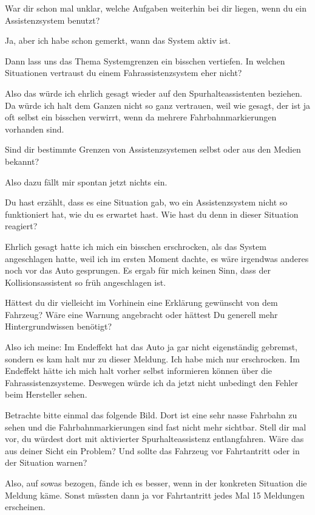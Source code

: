 \interviewerin
War dir schon mal unklar, welche Aufgaben weiterhin bei dir liegen,
wenn du ein Assistenzsystem benutzt?

Ja, aber ich habe schon gemerkt, wann das System aktiv ist.

\interviewerin
Dann lass uns das Thema Systemgrenzen ein bisschen vertiefen. In welchen
Situationen vertraust du einem Fahrassistenzsystem eher nicht?

Also das würde ich ehrlich gesagt wieder auf den Spurhalteassistenten
beziehen. Da würde ich halt dem Ganzen nicht so ganz vertrauen, weil wie
gesagt, der ist ja oft selbst ein bisschen verwirrt, wenn da mehrere
Fahrbahnmarkierungen vorhanden sind.

\interviewerin
Sind dir bestimmte Grenzen von Assistenzsystemen selbst oder aus den
Medien bekannt?

Also dazu fällt mir spontan jetzt nichts ein.

\interviewerin
Du hast erzählt, dass es eine Situation gab, wo ein Assistenzsystem
nicht so funktioniert hat, wie du es erwartet hast. Wie hast du denn in
dieser Situation reagiert?

Ehrlich gesagt hatte ich mich ein bisschen erschrocken, als das System
angeschlagen hatte, weil ich im ersten Moment dachte, es wäre irgendwas
anderes noch vor das Auto gesprungen. Es ergab für mich keinen Sinn,
dass der Kollisionsassistent so früh angeschlagen ist.

\interviewerin
Hättest du dir vielleicht im Vorhinein eine Erklärung gewünscht von dem
Fahrzeug? Wäre eine Warnung angebracht oder hättest Du generell mehr
Hintergrundwissen benötigt?

Also ich meine: Im Endeffekt hat das Auto ja gar nicht eigenständig
gebremst, sondern es kam halt nur zu dieser Meldung. Ich habe mich nur
erschrocken. Im Endeffekt hätte ich mich halt vorher selbst informieren
können über die Fahrassistenzsysteme. Deswegen würde ich da jetzt nicht
unbedingt den Fehler beim Hersteller sehen.

\interviewerin
Betrachte bitte einmal das folgende Bild. Dort ist eine sehr nasse
Fahrbahn zu sehen und die Fahrbahnmarkierungen sind fast nicht mehr
sichtbar. Stell dir mal vor, du würdest dort mit aktivierter
Spurhalteassistenz entlangfahren. Wäre das aus deiner Sicht ein Problem?
Und sollte das Fahrzeug vor Fahrtantritt oder in der Situation warnen?

Also, auf sowas bezogen, fände ich es besser, wenn in der konkreten
Situation die Meldung käme. Sonst müssten dann ja vor Fahrtantritt jedes
Mal 15 Meldungen erscheinen.

